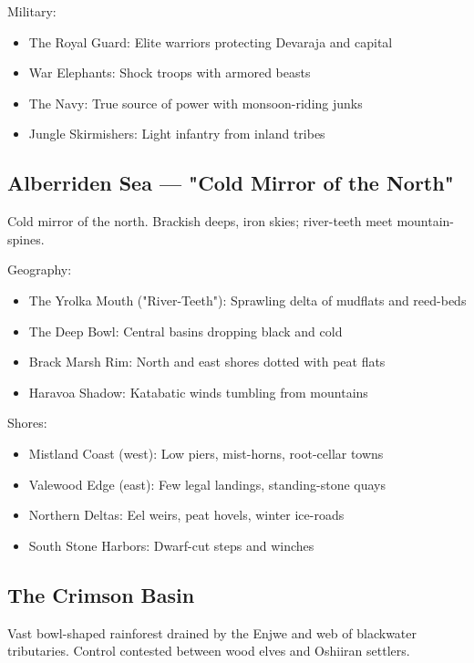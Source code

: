 Military:
\begin{itemize}
    \item The Royal Guard: Elite warriors protecting Devaraja and capital
    \item War Elephants: Shock troops with armored beasts
    \item The Navy: True source of power with monsoon-riding junks
    \item Jungle Skirmishers: Light infantry from inland tribes
\end{itemize}

\subsection{Alberriden Sea — "Cold Mirror of the North"}
\label{sec:alberriden}

Cold mirror of the north. Brackish deeps, iron skies; river-teeth meet mountain-spines.

Geography:
\begin{itemize}
    \item The Yrolka Mouth ("River-Teeth"): Sprawling delta of mudflats and reed-beds
    \item The Deep Bowl: Central basins dropping black and cold
    \item Brack Marsh Rim: North and east shores dotted with peat flats
    \item Haravoa Shadow: Katabatic winds tumbling from mountains
\end{itemize}

Shores:
\begin{itemize}
    \item Mistland Coast (west): Low piers, mist-horns, root-cellar towns
    \item Valewood Edge (east): Few legal landings, standing-stone quays
    \item Northern Deltas: Eel weirs, peat hovels, winter ice-roads
    \item South Stone Harbors: Dwarf-cut steps and winches
\end{itemize}

\subsection{The Crimson Basin}
\label{sec:crimsonbasin}

Vast bowl-shaped rainforest drained by the Enjwe and web of blackwater tributaries. Control contested between wood elves and Oshiiran settlers.

